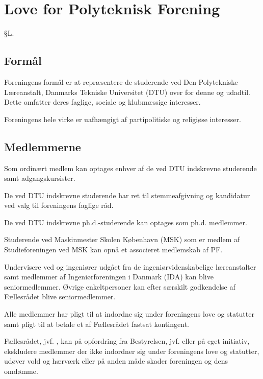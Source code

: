 \setcounter{section}{12}
\section*{Love for Polyteknisk Forening}

\begin{list}
{\S L.}{}




\subsection{Formål}\label{L:kap:Formaal}
\item Foreningens formål er at repræsentere de studerende ved Den Polytekniske Læreanstalt, Danmarks Tekniske Universitet (DTU) over for denne og udadtil. Dette omfatter deres faglige, sociale og klubmæssige interesser.

 Foreningens hele virke er uafhængigt af partipolitiske og religiøse interesser.

\subsection{Medlemmerne}
\label{L:kap:medlemmerne}
\item Som ordinært medlem kan optages enhver af de ved DTU indskrevne studerende samt adgangskursister.
\item De ved DTU indskrevne studerende har ret til stemmeafgivning og kandidatur ved valg til foreningens faglige råd.
\item De ved DTU indskrevne ph.d.-studerende kan optages som ph.d. medlemmer.
\item Studerende ved Maskinmester Skolen København (MSK) som er medlem af Studieforeningen ved MSK kan opnå et associeret medlemskab af PF.
\item Undervisere ved og ingeniører udgået fra de ingeniørvidenskabelige læreanstalter samt medlemmer af         Ingeniørforeningen i Danmark (IDA) kan blive seniormedlemmer. Øvrige enkeltpersoner kan efter særskilt godkendelse af Fællesrådet blive seniormedlemmer.
\item \label{L:Medlem:Pligt} Alle medlemmer har pligt til at indordne sig under foreningens love og statutter samt pligt til at betale et af Fællesrådet fastsat kontingent.

Fællesrådet, jvf. , kan på opfordring fra Bestyrelsen, jvf.  eller på eget initiativ, ekskludere medlemmer der ikke indordner sig under foreningens love og statutter, udøver vold og hærværk eller på anden måde skader foreningen og dens omdømme.


\end{list}
